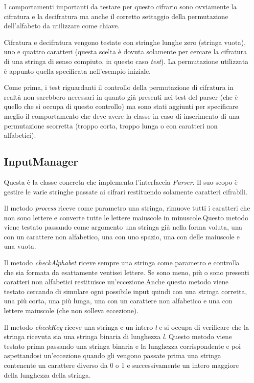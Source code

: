 			I comportamenti importanti da testare per questo cifrario sono ovviamente la cifratura e la decifratura ma anche il corretto settaggio della permutazione dell'alfabeto da utilizzare come chiave.
			
			Cifratura e decifratura vengono testate con stringhe lunghe zero (stringa vuota), uno e quattro caratteri (questa scelta è dovuta solamente per cercare la cifratura di una stringa di senso compiuto, in questo caso \emph{test}). La permutazione utilizzata è appunto quella specificata nell'esempio iniziale.
			
			Come prima, i test riguardanti il controllo della permutazione di cifratura in realtà non sarebbero necessari in quanto già presenti nei test del parser (che è quello che si occupa di questo controllo) ma sono stati aggiunti per specificare meglio il comportamento che deve avere la classe in caso di inserimento di una permutazione scorretta (troppo corta, troppo lunga o con caratteri non alfabetici).
			
		\subsection{InputManager}
			Questa è la classe concreta che implementa l'interfaccia \emph{Parser}. Il suo scopo è gestire le varie stringhe passate ai cifrari restituendo solamente caratteri cifrabili.
			
			Il metodo \emph{process} riceve come parametro una stringa, rimuove tutti i caratteri che non sono lettere e converte tutte le lettere maiuscole in minuscole.Questo metodo viene testato passando come argomento una stringa già nella forma voluta, una con un carattere non alfabetico, una con uno spazio, una con delle maiuscole e una vuota.
			
			Il metodo \emph{checkAlphabet} riceve sempre una stringa come parametro e controlla che sia formata da esattamente ventisei lettere. Se sono meno, più o sono presenti caratteri non alfabetici restituisce un'eccezione.Anche questo metodo viene testato cercando di simulare ogni possibile input quindi con una stringa corretta, una più corta, una più lunga, una con un carattere non alfabetico e una con lettere maiuscole (che non solleva eccezione).
			
			Il metodo \emph{checkKey} riceve una stringa e un intero \emph{l} e si occupa di verificare che la stringa ricevuta sia una stringa binaria di lunghezza \emph{l}. Questo metodo viene testato prima passando una stringa binaria e la lunghezza corrispondente e poi aspettandosi un'eccezione quando gli vengono passate prima una stringa contenente un carattere diverso da 0 o 1 e successivamente un intero maggiore della lunghezza della stringa.
			

